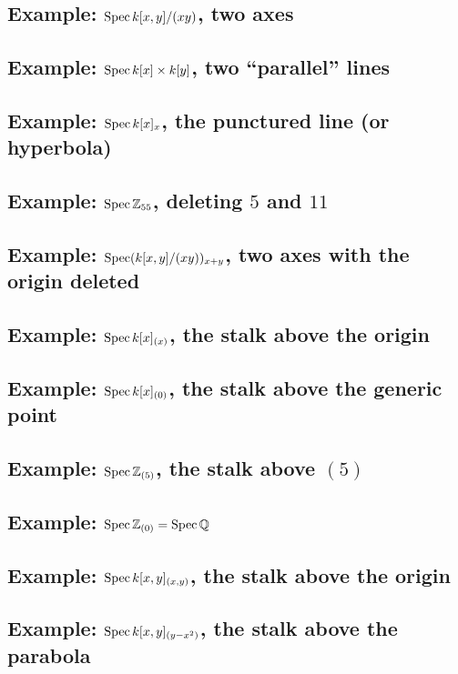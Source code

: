 \subsection{Example: $\operatorname{Spec} k[x,y]/(xy)$, two axes}
\subsection{Example: $\operatorname{Spec} k[x] \times k[y]$, two ``parallel'' lines}

\subsection{Example: $\operatorname{Spec} k[x]_x$, the punctured line (or hyperbola)}
\subsection{Example: $\operatorname{Spec} \mathbb Z_{55}$, deleting $5$ and $11$}

\subsection{Example: $\operatorname{Spec} (k[x,y]/(xy))_{x+y}$, two axes with the origin deleted}

\subsection{Example: $\operatorname{Spec} k[x]_{(x)}$, the stalk above the origin}
\subsection{Example: $\operatorname{Spec} k[x]_{(0)}$, the stalk above the generic point}
\subsection{Example: $\operatorname{Spec} \mathbb Z_{(5)}$, the stalk above $(5)$}
\subsection{Example: $\operatorname{Spec} \mathbb Z_{(0)} = \operatorname{Spec} \mathbb Q$}
\subsection{Example: $\operatorname{Spec} k[x,y]_{(x,y)}$, the stalk above the origin}
\subsection{Example: $\operatorname{Spec} k[x,y]_{(y-x^2)}$, the stalk above the parabola}
